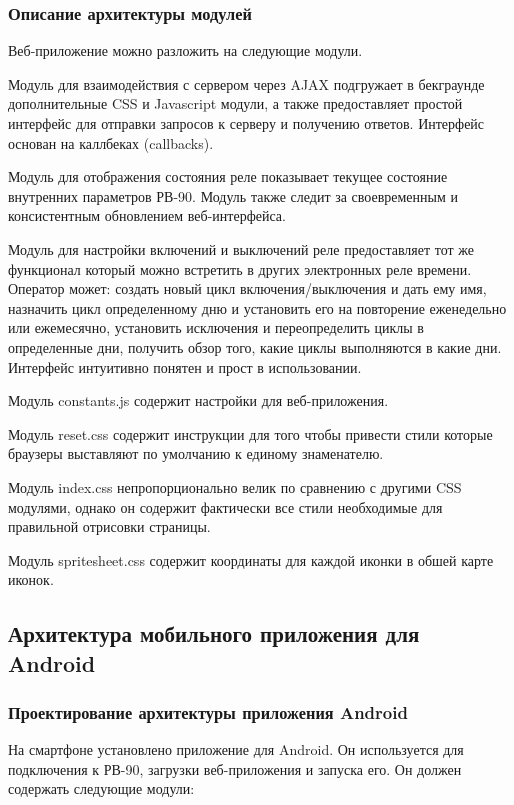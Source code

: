 \subsubsection{ Описание архитектуры модулей}
Веб-приложение можно разложить на следующие модули.

Модуль для взаимодействия с сервером через AJAX подгружает в бекграунде дополнительные CSS и Javascript модули, а также предоставляет простой интерфейс для отправки запросов к серверу и получению ответов. Интерфейс основан на каллбеках (callbacks).

Модуль для отображения состояния реле показывает текущее состояние внутренних параметров РВ-90. Модуль также следит за своевременным и консистентным обновлением веб-интерфейса.

Модуль для настройки включений и выключений реле предоставляет тот же функционал который можно встретить в других электронных реле времени. Оператор может: создать новый цикл включения/выключения и дать ему имя, назначить цикл определенному дню и установить его на повторение еженедельно или ежемесячно, установить исключения и переопределить циклы в определенные дни, получить обзор того, какие циклы выполняются в какие дни. Интерфейс интуитивно понятен и прост в использовании.

Модуль constants.js  содержит настройки для веб-приложения.

Модуль reset.css содержит инструкции для того чтобы привести стили которые браузеры выставляют по умолчанию к единому знаменателю.

Модуль index.css непропорционально велик по сравнению с другими CSS модулями, однако он содержит фактически все стили необходимые для правильной отрисовки страницы.

Модуль spritesheet.css содержит координаты для каждой иконки в обшей карте иконок.


\newpage
\subsection{Архитектура мобильного приложения для Android}



\subsubsection{Проектирование архитектуры приложения Android}
На смартфоне установлено приложение для Android. Он используется для подключения к РВ-90, загрузки веб-приложения и запуска его. Он должен содержать следующие модули:

